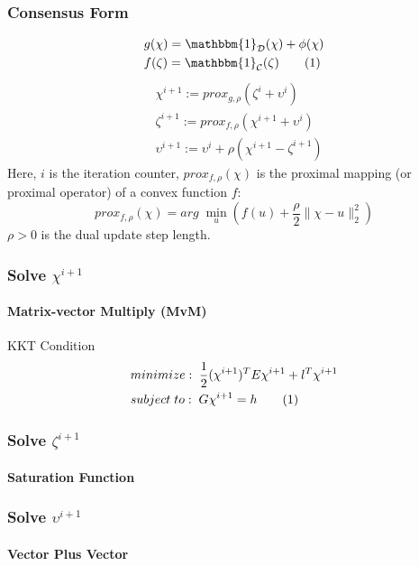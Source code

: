 \documentclass{beamer}
\newcommand\numberthis{\addtocounter{equation}{1}\tag{\theequation}}
\begin{document}
\begin{frame}  
\frametitle{Consensus Form}
\begin{align*}
&g(\chi)=\mathbbm{1}_{\mathcal{D}}(\chi)+\phi(\chi)\\
&f(\zeta)=\mathbbm{1}_{\mathcal{C}}(\zeta) 
\numberthis \label{eq:gf}
\end{align*}
\begin{align}
&\chi^{i+1}:=prox_{g,\rho}(\zeta^i+\upsilon^i)\label{eq:xi}\\
&\zeta^{i+1}:=prox_{f,\rho}(\chi^{i+1}+\upsilon^i)\label{eq:zi}\\
&\upsilon^{i+1}:=\upsilon^i+\rho (\chi^{i+1}-\zeta^{i+1})\label{eq:vi}
\end{align}
Here, $i$ is the iteration counter, $prox_{f,\rho}(\chi)$ is the proximal mapping (or proximal operator) of a convex function $f$: 
\begin{equation*}
prox_{f,\rho}(\chi)=arg\;\underset{u}{\min}(f(u)+\frac{\rho}{2}\| \chi-u\| _2^2)
\end{equation*}
$\rho>0$ is the dual update step length. 

\end{frame}

\begin{frame}
\frametitle{Solve $\chi^{i+1}$}
\framesubtitle{Matrix-vector Multiply (MvM)}
KKT Condition
\begin{align*}
&minimize:\;  \frac{1}{2} ({\chi^{i+1}})^{T}E\chi^{i+1}+l^T\chi^{i+1}\\
 &subject\;  to:\; G\chi^{i+1}=h
\numberthis \label{eq:quad}
\end{align*}
\end{frame}

\begin{frame}
\frametitle{Solve $\zeta^{i+1}$}
\framesubtitle{Saturation Function}

\end{frame}

\begin{frame}
\frametitle{Solve $\upsilon^{i+1}$}
\framesubtitle{Vector Plus Vector}

\end{frame}
\end{document}
